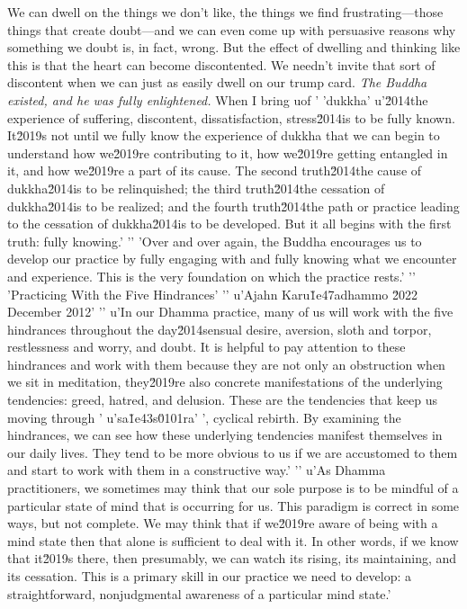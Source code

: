 We can dwell on the things we don't like, the things we find 
frustrating---those things that create doubt---and we can even come up 
with persuasive reasons why something we doubt is, in fact, wrong. But 
the effect of dwelling and thinking like this is that the heart can 
become discontented. We needn't invite that sort of discontent when we 
can just as easily dwell on our trump card. \emph{The Buddha existed, 
and he was fully enlightened.} When I bring uof '
'dukkha'
u'\u2014the experience of suffering, discontent, dissatisfaction, stress\u2014is to be fully known. It\u2019s not until we fully know the experience of dukkha that we can begin to understand how we\u2019re contributing to it, how we\u2019re getting entangled in it, and how we\u2019re a part of its cause. The second truth\u2014the cause of dukkha\u2014is to be relinquished; the third truth\u2014the cessation of dukkha\u2014is to be realized; and the fourth truth\u2014the path or practice leading to the cessation of dukkha\u2014is to be developed. But it all begins with the first truth: fully knowing.'
'\n'
'Over and over again, the Buddha encourages us to develop our practice by fully engaging with and fully knowing what we encounter and experience. This is the very foundation on which the practice rests.'
'\n'
'Practicing With the Five Hindrances'
'\n'
u'Ajahn Karu\u1e47adhammo \u2022 December 2012'
'\n'
u'In our Dhamma practice, many of us will work with the five hindrances throughout the day\u2014sensual desire, aversion, sloth and torpor, restlessness and worry, and doubt. It is helpful to pay attention to these hindrances and work with them because they are not only an obstruction when we sit in meditation, they\u2019re also concrete manifestations of the underlying tendencies: greed, hatred, and delusion. These are the tendencies that keep us moving through '
u'sa\u1e43s\u0101ra'
', cyclical rebirth. By examining the hindrances, we can see how these underlying tendencies manifest themselves in our daily lives. They tend to be more obvious to us if we are accustomed to them and start to work with them in a constructive way.'
'\n'
u'As Dhamma practitioners, we sometimes may think that our sole purpose is to be mindful of a particular state of mind that is occurring for us. This paradigm is correct in some ways, but not complete. We may think that if we\u2019re aware of being with a mind state then that alone is sufficient to deal with it. In other words, if we know that it\u2019s there, then presumably, we can watch its rising, its maintaining, and its cessation. This is a primary skill in our practice we need to develop: a straightforward, nonjudgmental awareness of a particular mind state.'
